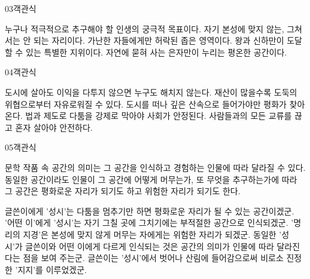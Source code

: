 \documentclass[fs85,seriesWit]{korfarm-base}
\begin{document}
\begin{kfQBlock}{03}{객관식}
\begin{kfChoices}
\kfChoice 누구나 적극적으로 추구해야 할 인생의 궁극적 목표이다.
\kfChoice 자기 본성에 맞지 않는, 그쳐서는 안 되는 자리이다.
\kfChoice 가난한 자들에게만 허락된 좁은 영역이다.
\kfChoice 왕과 신하만이 도달할 수 있는 특별한 지위이다.
\kfChoice 자연에 묻혀 사는 은자만이 누리는 평온한 공간이다.
\end{kfChoices}
\end{kfQBlock}

\begin{kfQBlock}{04}{객관식}
\begin{kfChoices}
\kfChoice 도시에 살아도 이익을 다투지 않으면 누구도 해치지 않는다.
\kfChoice 재산이 많을수록 도둑의 위협으로부터 자유로워질 수 있다.
\kfChoice 도시를 떠나 깊은 산속으로 들어가야만 평화가 찾아온다.
\kfChoice 법과 제도로 다툼을 강제로 막아야 사회가 안정된다.
\kfChoice 사람들과의 모든 교류를 끊고 혼자 살아야 안전하다.
\end{kfChoices}
\end{kfQBlock}

\begin{kfQBlock}{05}{객관식}
\begin{kfEvidence}문학 작품 속 공간의 의미는 그 공간을 인식하고 경험하는 인물에 따라 달라질 수 있다. 동일한 공간이라도 인물이 그 공간에 어떻게 머무는가, 또 무엇을 추구하는가에 따라 그 공간은 평화로운 자리가 되기도 하고 위험한 자리가 되기도 한다.\end{kfEvidence}
\begin{kfChoices}
\kfChoice 글쓴이에게 '성시'는 다툼을 멈추기만 하면 평화로운 자리가 될 수 있는 공간이겠군.
\kfChoice '어떤 이'에게 '성시'는 자기 그칠 곳에 그치기에는 부적절한 공간으로 인식되겠군.
\kfChoice '명리의 지경'은 본성에 맞지 않게 머무는 자에게는 위험한 자리가 되겠군.
\kfChoice 동일한 '성시'가 글쓴이와 어떤 이에게 다르게 인식되는 것은 공간의 의미가 인물에 따라 달라진다는 점을 보여 주는군.
\kfChoice 글쓴이는 '성시'에서 벗어나 산림에 들어감으로써 비로소 진정한 '지지'를 이루었겠군.
\end{kfChoices}
\end{kfQBlock}

\kfEndMC
\end{document}
